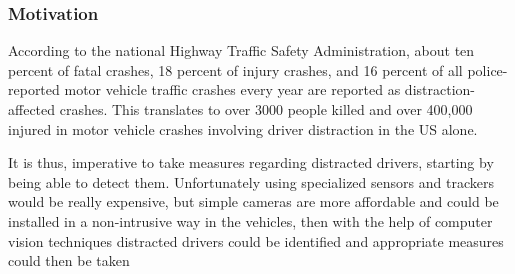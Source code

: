 \documentclass{beamer}
\begin{document}
	\begin{frame}
		\frametitle{Motivation}
		According to the national Highway Traffic Safety Administration, about ten percent of fatal crashes, 18 percent of injury crashes, and
		16 percent of all police-reported motor vehicle traffic crashes
		every year are reported as distraction-affected crashes. This translates to over 3000 people killed and over 400,000 injured in motor vehicle crashes involving driver distraction in the US alone.
		
		It is thus, imperative to take measures regarding distracted drivers, starting by being able to detect them. Unfortunately using specialized sensors and trackers would be really expensive, but simple cameras are more affordable and could be installed in a non-intrusive way in the vehicles, then with the help of computer vision techniques distracted drivers could be identified and appropriate measures could then be taken
	\end{frame}
	
\end{document}

